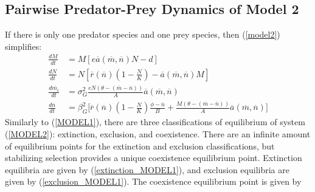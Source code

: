 \documentclass{amsart}
\theoremstyle{definition}
\theoremstyle{remark}
\numberwithin{equation}{section}
\begin{document}
\subsection{Pairwise Predator-Prey Dynamics of Model 2}
If there is only one predator species and one prey species, then (\ref{model2}) simplifies:
\begin{subequations}
	\label{MODEL2}
	\begin{align}
		\label{eq:MODEL2_A}
		\frac{dM}{dt} &= M\left[e\overline{a}(\overline{m}, \overline{n})N - d\right] \\[5px]
		\label{eq:MODEL2_B}
		\frac{dN}{dt} &= N\left[\overline{r}(\overline{n})\left(1 - \frac{N}{K}\right) - \overline{a}(\overline{m}, \overline{n})M\right] \\[5px]
		\label{eq:MODEL2_C}
		\frac{d\overline{m_i}}{dt} &= \sigma_{G}^2\frac{eN(\theta - (\overline{m} - \overline{n}))}{A}\overline{a}(\overline{m}, \overline{n}) \\[5px]
		\label{eq:MODEL2_D}
		\frac{d\overline{n}}{dt} &= \beta_{G}^2\Bigg[\overline{r}(\overline{n})\left(1 - \frac{N}{K}\right)\frac{\phi - \overline{n}}{B} + \frac{M(\theta - (\overline{m} - \overline{n}))}{A}\overline{a}(\overline{m}, \overline{n})\Bigg]
	\end{align}
\end{subequations}
Similarly to (\ref{MODEL1}), there are three classifications of equilibrium of system (\ref{MODEL2}): extinction, exclusion, and coexistence.  There are an infinite amount of equilibrium points for the extinction and exclusion classifications, but stabilizing selection provides a unique coexistence equilibrium point.  Extinction equilibria are given by (\ref{extinction_MODEL1}), and exclusion equilibria are given by (\ref{exclusion_MODEL1}).  The coexistence equilibrium point is given by
\end{document}
